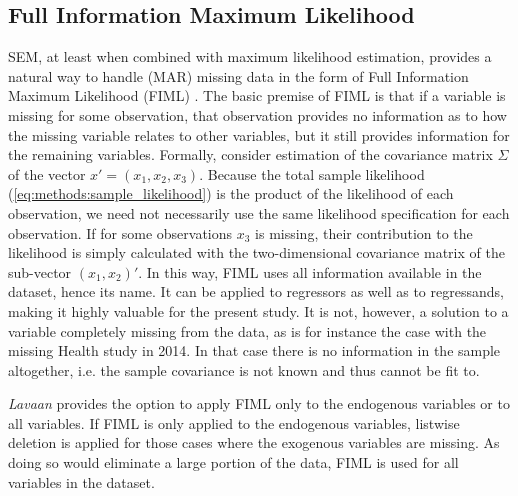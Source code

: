 \subsection{Full Information Maximum Likelihood}
\label{sec:methods:fiml}
SEM, at least when combined with maximum likelihood estimation, provides a natural way to handle (MAR) missing data in the
form of Full Information Maximum Likelihood (FIML) \cite{arbuckle2013full}.
The basic premise of FIML is that if a variable is missing for some observation, that observation provides no information
as to how the missing variable relates to other variables, but it still provides information for the remaining variables.
Formally, consider estimation of the covariance matrix $\Sigma$ of the vector $x' = (x_1, x_2, x_3)$.
Because the total sample likelihood (\cref{eq:methods:sample_likelihood}) is the product of the likelihood of each observation,
we need not necessarily use the same likelihood specification for each observation.
If for some observations $x_3$ is missing, their contribution to the likelihood is simply calculated with the two-dimensional
covariance matrix of the sub-vector $(x_1, x_2)'$.
In this way, FIML uses all information available in the dataset, hence its name. It can be applied to regressors
as well as to regressands, making it highly valuable for the present study.
It is not, however, a solution to a variable completely missing from the data, as is for instance the case with the
missing Health study in 2014. In that case there is no information in the sample altogether, i.e. the sample covariance
is not known and thus cannot be fit to.

\textit{Lavaan} provides the option to apply FIML only to the endogenous variables or to all variables.
If FIML is only applied to the endogenous variables, listwise deletion is applied for those cases where the exogenous
variables are missing. As doing so would eliminate a large portion of the data, FIML is used for all variables in the dataset.

